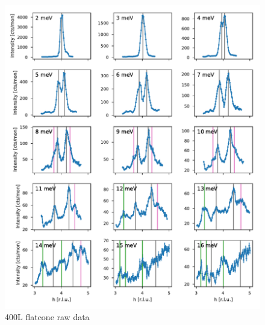 \begin{figure}
    \centering
    \includegraphics[width=\textwidth]{fig/lowen/fits_400L.pdf}
    \caption[400L flatcone raw data]{400L flatcone raw data}
\end{figure}


